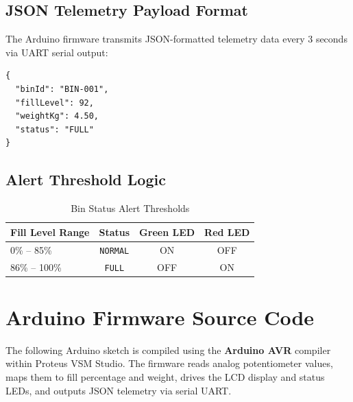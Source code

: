 \documentclass[12pt,a4paper]{article}
\begin{document}
\subsection{JSON Telemetry Payload Format}

The Arduino firmware transmits JSON-formatted telemetry data every 3 seconds via UART serial output:

\begin{lstlisting}[style=arduino, language={}]
{
  "binId": "BIN-001",
  "fillLevel": 92,
  "weightKg": 4.50,
  "status": "FULL"
}
\end{lstlisting}

\subsection{Alert Threshold Logic}

\begin{table}[H]
\centering
\caption{Bin Status Alert Thresholds}
\label{tab:thresholds}
\begin{tabular}{@{}lccc@{}}
\toprule
\textbf{Fill Level Range} & \textbf{Status} & \textbf{Green LED} & \textbf{Red LED} \\
\midrule
0\% -- 85\%    & \texttt{NORMAL}       & ON  & OFF \\
86\% -- 100\%  & \texttt{FULL}         & OFF & ON  \\
\bottomrule
\end{tabular}
\end{table}

\section{Arduino Firmware Source Code}

The following Arduino sketch is compiled using the \textbf{Arduino AVR} compiler within Proteus VSM Studio. The firmware reads analog potentiometer values, maps them to fill percentage and weight, drives the LCD display and status LEDs, and outputs JSON telemetry via serial UART.
\end{document}
